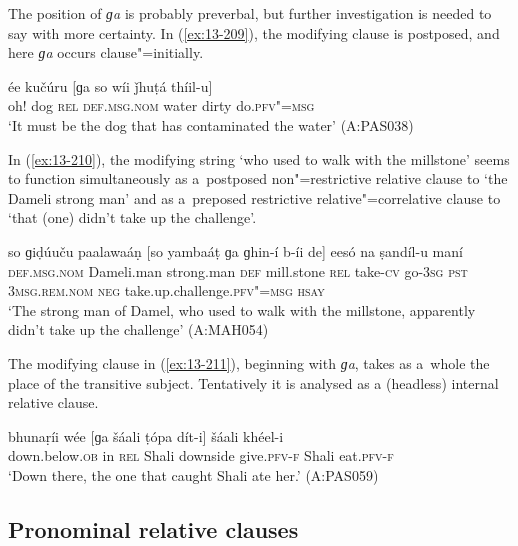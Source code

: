 The position of \textit{ɡa} is probably preverbal, but further investigation is needed to say with more certainty. In (\ref{ex:13-209}), the modifying clause is postposed, and here \textit{ɡa} occurs clause"=initially.

\begin{exe}
\ex
\label{ex:13-209}
\gll ée kučúru [ɡa so wíi ǰhuṭá thíil-u]  \\
oh! dog \textsc{rel} \textsc{def.msg.nom} water dirty do.\textsc{pfv"=msg} \\
\glt `It must be the dog that has contaminated the water' (A:PAS038) 
\end{exe}

In (\ref{ex:13-210}), the modifying string `who used to walk with the millstone' seems to function simultaneously as a~postposed non"=restrictive relative clause to `the Dameli strong man' and as a~preposed restrictive relative"=correlative clause to `that (one) didn't take up the challenge'.

\begin{exe}
\ex
\label{ex:13-210}
\gll so ɡiḍúuču paalawaáṇ [so yambaáṭ  ɡa ɡhin-í b-íi de] eesó na  ṣandíl-u maní \\
\textsc{def.msg.nom} Dameli.man strong.man \textsc{def} mill.stone \textsc{rel} take-\textsc{cv} go-\textsc{3sg} \textsc{pst} \textsc{3msg.rem.nom} \textsc{neg} take.up.challenge.\textsc{pfv"=msg} \textsc{hsay} \\
\glt `The strong man of Damel, who used to walk with the millstone, apparently didn't take up the
challenge' (A:MAH054)
\end{exe}

The modifying clause in (\ref{ex:13-211}), beginning with \textit{ɡa}, takes as a~whole the place of the transitive subject. Tentatively it is analysed as a (headless) internal relative clause.

\begin{exe}
\ex
\label{ex:13-211}
\gll bhunaṛíi wée [ɡa šáali ṭópa dít-i]  šáali khéel-i \\
down.below.\textsc{ob} in \textsc{rel} Shali downside give.\textsc{pfv-f} Shali eat.\textsc{pfv-f} \\
\glt `Down there, the one that caught Shali ate her.' (A:PAS059)
\end{exe}

\subsection{Pronominal relative clauses}
\label{subsec:13-6-5}


